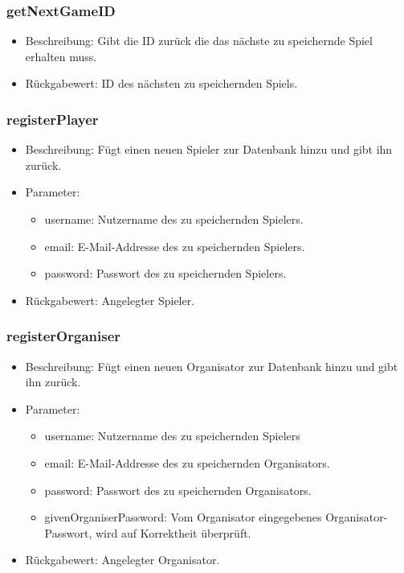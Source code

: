 \documentclass[a4paper]{scrreprt}
\begin{document}
    \subsubsection{getNextGameID}
    \begin{itemize}
        \item Beschreibung: Gibt die ID zurück die das nächste zu speichernde Spiel erhalten muss.
        \item Rückgabewert: ID des nächsten zu speichernden Spiels.
    \end{itemize}

	\subsubsection{registerPlayer}
	\begin{itemize}
		\item Beschreibung: Fügt einen neuen Spieler zur Datenbank hinzu und gibt ihn zurück.
		\item Parameter:
		\begin{itemize}
			\item username: Nutzername des zu speichernden Spielers.
			\item email: E-Mail-Addresse des zu speichernden Spielers.
			\item password: Passwort des zu speichernden Spielers.
		\end{itemize}
		\item Rückgabewert: Angelegter Spieler.
	\end{itemize}

	\subsubsection{registerOrganiser}
	\begin{itemize}
		\item Beschreibung: Fügt einen neuen Organisator zur Datenbank hinzu und gibt ihn zurück.
		\item Parameter:
		\begin{itemize}
			\item username: Nutzername des zu speichernden Spielers
			\item email: E-Mail-Addresse des zu speichernden Organisators.
			\item password: Passwort des zu speichernden Organisators.
			\item givenOrganiserPassword: Vom Organisator eingegebenes Organisator-Passwort, wird auf Korrektheit überprüft.
		\end{itemize}
		\item Rückgabewert: Angelegter Organisator.
	\end{itemize}
\end{document}
